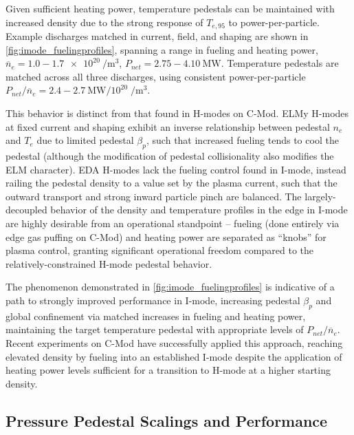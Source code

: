 Given sufficient heating power, temperature pedestals can be maintained with increased density due to the strong response of $T_{e,95}$ to power-per-particle.  Example discharges matched in current, field, and shaping are shown in \cref{fig:imode_fuelingprofiles}, spanning a range in fueling and heating power, $\overline{n}_e = 1.0 - \SI{1.7e20}{\per\meter\cubed}$, $P_{net} = 2.75 - \SI{4.10}{\mega\watt}$.  Temperature pedestals are matched across all three discharges, using consistent power-per-particle $P_{net}/\overline{n}_e = 2.4 - \SI{2.7}{\mega\watt}/10^{20}\;\si{\per\meter\cubed}$.

This behavior is distinct from that found in H-modes on C-Mod.  ELMy H-modes at fixed current and shaping exhibit an inverse relationship between pedestal $n_e$ and $T_e$ due to limited pedestal $\beta_p$, such that increased fueling tends to cool the pedestal (although the modification of pedestal collisionality also modifies the ELM character).  EDA H-modes lack the fueling control found in I-mode, instead railing the pedestal density to a value set by the plasma current, such that the outward transport and strong inward particle pinch are balanced.  The largely-decoupled behavior of the density and temperature profiles in the edge in I-mode are highly desirable from an operational standpoint -- fueling (done entirely via edge gas puffing on C-Mod) and heating power are separated as ``knobs'' for plasma control, granting significant operational freedom compared to the relatively-constrained H-mode pedestal behavior.

The phenomenon demonstrated in \cref{fig:imode_fuelingprofiles} is indicative of a path to strongly improved performance in I-mode, increasing pedestal $\beta_p$ and global confinement via matched increases in fueling and heating power, maintaining the target temperature pedestal with appropriate levels of $P_{net}/\overline{n}_e$.  Recent experiments on C-Mod \cite{Hubbard2012} have successfully applied this approach, reaching elevated density by fueling into an established I-mode despite the application of heating power levels sufficient for a transition to H-mode at a higher starting density.

\subsection{Pressure Pedestal Scalings and Performance}\label{subsec:imode_pres}

